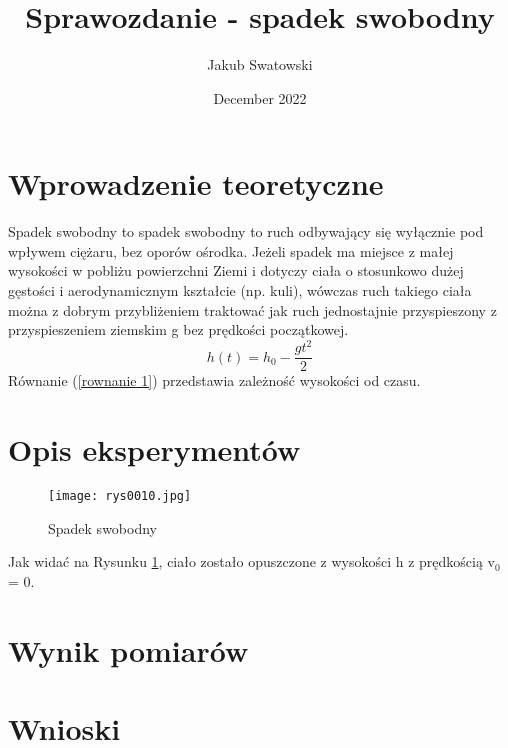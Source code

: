 \documentclass{article}
\title{Sprawozdanie - spadek swobodny}
\author{Jakub Swatowski}
\date{December 2022}
\begin{document}
\maketitle

\section{Wprowadzenie teoretyczne}
Spadek swobodny to spadek swobodny to ruch odbywający się wyłącznie pod wpływem ciężaru, bez oporów ośrodka. Jeżeli spadek ma miejsce z małej wysokości w pobliżu powierzchni Ziemi i dotyczy ciała o stosunkowo dużej gęstości i aerodynamicznym kształcie (np. kuli), wówczas ruch takiego ciała można z dobrym przybliżeniem traktować jak ruch jednostajnie przyspieszony z przyspieszeniem ziemskim g bez prędkości początkowej.
\begin{equation}
   h(t) = h_0 - \frac{gt^2}{2}
   \label{rownanie 1}
\end{equation}
Równanie (\ref{rownanie 1}) przedstawia zależność wysokości od czasu.

\section{Opis eksperymentów}
\begin{figure}[htb]
    \texttt{[image: rys0010.jpg]}
    \centering
    \caption{Spadek swobodny}
    \label{rysunek 1}
\end{figure}
\begin{flushleft}
Jak widać na Rysunku \ref{rysunek 1}, ciało zostało opuszczone z wysokości h z prędkością v$_0$ = 0.
\end{flushleft}

\section{Wynik pomiarów}

\section{Wnioski}
\end{document}
